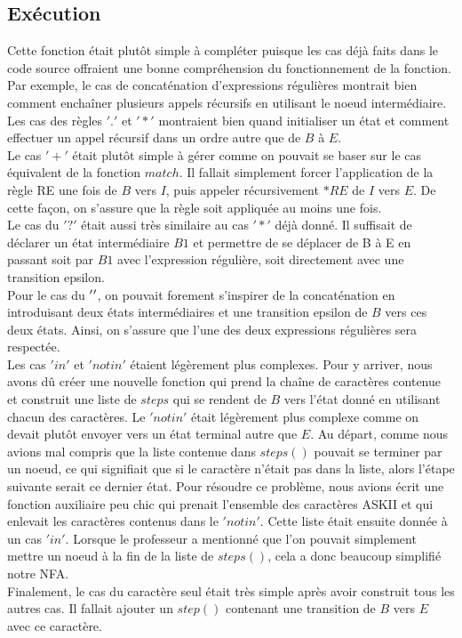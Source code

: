 \documentclass{article}
\begin{document}
 \subsection{Exécution}
 
    Cette fonction était plutôt simple à compléter puisque les cas déjà faits 
    dans le code source offraient une bonne compréhension du fonctionnement de
    la fonction. Par exemple, le cas de concaténation d'expressions régulières 
    montrait bien comment enchaîner plusieurs appels récursifs en utilisant 
    le noeud intermédiaire. Les cas des règles $'.'$ et $'*'$ montraient bien quand 
    initialiser un état et comment effectuer un appel récursif dans un ordre 
    autre que de $B$ à $E$.\\
    Le cas $'+'$ était plutôt simple à gérer comme on pouvait se baser sur le 
    cas équivalent de la fonction $match$. Il fallait simplement forcer 
    l'application de la règle RE une fois de $B$ vers $I$, puis appeler 
    récursivement $*RE$ de $I$ vers $E$. De cette façon, on s'assure que la règle 
    soit appliquée au moins une fois. \\
    Le cas du $'?'$ était aussi très similaire au cas $'*'$ déjà donné. Il 
    suffisait de déclarer un état intermédiaire $B1$ et permettre de se 
    déplacer de B à E en passant soit par $B1$ avec l'expression régulière, 
    soit directement avec une transition epsilon. \\
    Pour le cas du $'\/'$, on pouvait forement s'inspirer de la concaténation 
    en introduisant deux états intermédiaires et une transition epsilon de 
    $B$ vers ces deux états. Ainsi, on s'assure que l'une des deux expressions 
    régulières sera respectée. \\
    Les cas $'in'$ et $'notin'$ étaient légèrement plus complexes. Pour y arriver, 
    nous avons dû créer une nouvelle fonction qui prend la chaîne de 
    caractères contenue et construit une liste de $steps$ qui se rendent de $B$ 
    vers l'état donné en utilisant chacun des caractères. Le $'notin'$ était 
    légèrement plus complexe comme on devait plutôt envoyer vers un état 
    terminal autre que $E$. Au départ, comme nous avions mal compris que la liste 
    contenue dans $steps()$ pouvait se terminer par un noeud, ce qui signifiait 
    que si le caractère n'était pas dans la liste, alors l'étape suivante serait 
    ce dernier état. Pour résoudre ce problème, nous avions écrit une fonction 
    auxiliaire peu chic qui prenait l'ensemble des caractères ASKII et qui 
    enlevait les caractères contenus dans le $'notin'$. Cette liste était ensuite 
    donnée à un cas $'in'$. Lorsque le professeur a mentionné que l'on pouvait 
    simplement mettre un noeud à la fin de la liste de $steps()$, cela a donc 
    beaucoup simplifié notre NFA.\\
    Finalement, le cas du caractère seul était très simple après avoir 
    construit tous les autres cas. Il fallait ajouter un $step()$ contenant 
    une transition de $B$ vers $E$ avec ce caractère.
    
\end{document}

